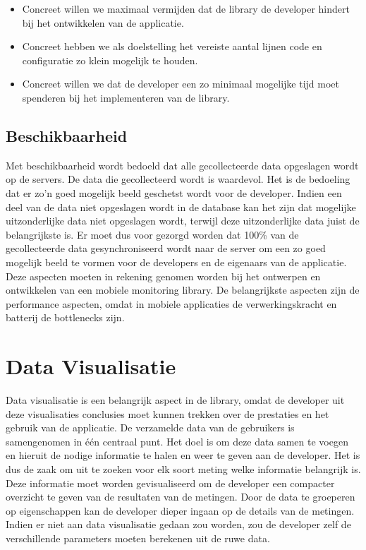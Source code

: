 \begin{itemize}
\item Concreet willen we maximaal vermijden dat de library de developer hindert bij het ontwikkelen van de applicatie.

\item Concreet hebben we als doelstelling het vereiste aantal lijnen code en configuratie zo klein mogelijk te houden.

\item Concreet willen we dat de developer een zo minimaal mogelijke tijd moet spenderen bij het implementeren van de library.
\end{itemize}




\subsection{Beschikbaarheid}
Met beschikbaarheid wordt bedoeld dat alle gecollecteerde data opgeslagen wordt op de servers. De data die gecollecteerd wordt is waardevol. Het is de bedoeling dat er zo'n goed mogelijk beeld geschetst wordt voor de developer. Indien een deel van de data niet opgeslagen wordt in de database kan het zijn dat mogelijke uitzonderlijke data niet opgeslagen wordt, terwijl deze uitzonderlijke data juist de belangrijkste is. Er moet dus voor gezorgd worden dat 100\% van de gecollecteerde data gesynchroniseerd wordt naar de server om een zo goed mogelijk beeld te vormen voor de developers en de eigenaars van de applicatie.\\


Deze aspecten moeten in rekening genomen worden bij het ontwerpen en ontwikkelen van een mobiele monitoring library. De belangrijkste aspecten zijn de performance aspecten, omdat in mobiele applicaties de verwerkingskracht en batterij de bottlenecks zijn. 


\section{Data Visualisatie}
Data visualisatie is een belangrijk aspect in de library, omdat de developer uit deze visualisaties conclusies moet kunnen trekken over de prestaties en het gebruik van de applicatie. De verzamelde data van de gebruikers is samengenomen in \'e\'en centraal punt. Het doel is om deze data samen te voegen en hieruit de nodige informatie te halen en weer te geven aan de developer. Het is dus de zaak om uit te zoeken voor elk soort meting welke informatie belangrijk is. Deze informatie moet worden gevisualiseerd om de developer een compacter overzicht te geven van de resultaten van de metingen. Door de data te groeperen op eigenschappen kan de developer dieper ingaan op de details van de metingen. Indien er niet aan data visualisatie gedaan zou worden, zou de developer zelf de verschillende parameters moeten berekenen uit de ruwe data. \\


